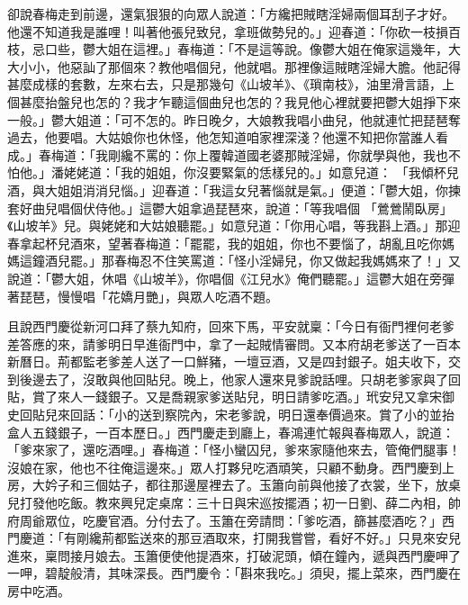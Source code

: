卻說春梅走到前邊，還氣狠狠的向眾人說道：「方纔把賊瞎淫婦兩個耳刮子才好。他還不知道我是誰哩！叫著他張兒致兒，拿班做勢兒的。」迎春道：「你砍一枝損百枝，忌口些，鬱大姐在這裡。」春梅道：「不是這等說。像鬱大姐在俺家這幾年，大大小小，他惡訕了那個來？教他唱個兒，他就唱。那裡像這賊瞎淫婦大膽。他記得甚麼成樣的套數，左來右去，只是那幾句《山坡羊》、《瑣南枝》，油里滑言語，上個甚麼抬盤兒也怎的？我才乍聽這個曲兒也怎的？我見他心裡就要把鬱大姐掙下來一般。」鬱大姐道：「可不怎的。昨日晚夕，大娘教我唱小曲兒，他就連忙把琵琶奪過去，他要唱。大姑娘你也休怪，他怎知道咱家裡深淺？他還不知把你當誰人看成。」春梅道：「我剛纔不罵的：你上覆韓道國老婆那賊淫婦，你就學與他，我也不怕他。」潘姥姥道：「我的姐姐，你沒要緊氣的恁樣兒的。」如意兒道： 「我傾杯兒酒，與大姐姐消消兒惱。」迎春道：「我這女兒著惱就是氣。」便道：「鬱大姐，你揀套好曲兒唱個伏侍他。」這鬱大姐拿過琵琶來，說道：「等我唱個 「鶯鶯鬧臥房」《山坡羊》兒。與姥姥和大姑娘聽罷。」如意兒道：「你用心唱，等我斟上酒。」那迎春拿起杯兒酒來，望著春梅道：「罷罷，我的姐姐，你也不要惱了，胡亂且吃你媽媽這鐘酒兒罷。」那春梅忍不住笑罵道：「怪小淫婦兒，你又做起我媽媽來了！」又說道：「鬱大姐，休唱《山坡羊》，你唱個《江兒水》俺們聽罷。」這鬱大姐在旁彈著琵琶，慢慢唱「花嬌月艷」，與眾人吃酒不題。

且說西門慶從新河口拜了蔡九知府，回來下馬，平安就稟：「今日有衙門裡何老爹差答應的來，請爹明日早進衙門中，拿了一起賊情審問。又本府胡老爹送了一百本新曆日。荊都監老爹差人送了一口鮮豬，一壇豆酒，又是四封銀子。姐夫收下，交到後邊去了，沒敢與他回貼兒。晚上，他家人還來見爹說話哩。只胡老爹家與了回貼，賞了來人一錢銀子。又是喬親家爹送貼兒，明日請爹吃酒。」玳安兒又拿宋御史回貼兒來回話：「小的送到察院內，宋老爹說，明日還奉價過來。賞了小的並抬盒人五錢銀子，一百本歷日。」西門慶走到廳上，春鴻連忙報與春梅眾人，說道：「爹來家了，還吃酒哩。」春梅道：「怪小蠻囚兒，爹來家隨他來去，管俺們腿事！沒娘在家，他也不往俺這邊來。」眾人打夥兒吃酒頑笑，只顧不動身。西門慶到上房，大妗子和三個姑子，都往那邊屋裡去了。玉簫向前與他接了衣裳，坐下，放桌兒打發他吃飯。教來興兒定桌席：三十日與宋巡按擺酒；初一日劉、薛二內相，帥府周爺眾位，吃慶官酒。分付去了。玉簫在旁請問：「爹吃酒，篩甚麼酒吃？」西門慶道：「有剛纔荊都監送來的那豆酒取來，打開我嘗嘗，看好不好。」只見來安兒進來，稟問接月娘去。玉簫便使他提酒來，打破泥頭，傾在鐘內，遞與西門慶呷了一呷，碧靛般清，其味深長。西門慶令：「斟來我吃。」須臾，擺上菜來，西門慶在房中吃酒。

